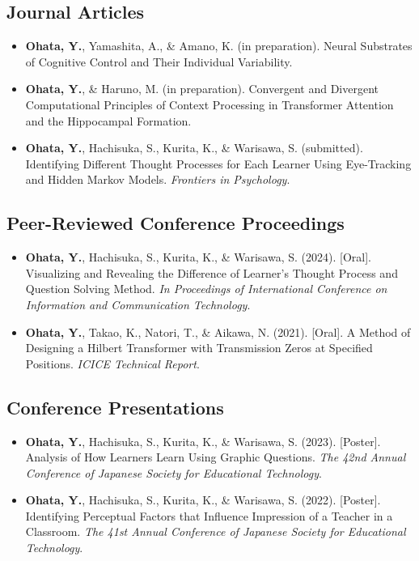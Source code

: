 \documentclass[letterpaper,10.5pt]{article}
\begin{document}
\subsection*{Journal Articles}
\begin{itemize}[label={}, leftmargin=15pt, itemsep=4pt, parsep=0pt, topsep=2pt]
  \item \textbf{Ohata, Y.}, Yamashita, A., \& Amano, K. (in preparation). Neural Substrates of Cognitive Control and Their Individual Variability.
  \item \textbf{Ohata, Y.}, \& Haruno, M. (in preparation). Convergent and Divergent Computational Principles of Context Processing in Transformer Attention and the Hippocampal Formation.
  \item \textbf{Ohata, Y.}, Hachisuka, S., Kurita, K., \& Warisawa, S. (submitted). Identifying Different Thought Processes for Each Learner Using Eye-Tracking and Hidden Markov Models. \textit{Frontiers in Psychology}.
\end{itemize}\vspace{2pt}
\subsection*{Peer-Reviewed Conference Proceedings}
\begin{itemize}[label={}, leftmargin=15pt, itemsep=4pt, parsep=0pt, topsep=2pt]
  \item \textbf{Ohata, Y.}, Hachisuka, S., Kurita, K., \& Warisawa, S. (2024). [Oral]. Visualizing and Revealing the Difference of Learner's Thought Process and Question Solving Method. \textit{In Proceedings of International Conference on Information and Communication Technology}.
  \item \textbf{Ohata, Y.}, Takao, K., Natori, T., \& Aikawa, N. (2021). [Oral]. A Method of Designing a Hilbert Transformer with Transmission Zeros at Specified Positions. \textit{ICICE Technical Report}.
\end{itemize}\vspace{2pt}
\subsection*{Conference Presentations}
\begin{itemize}[label={}, leftmargin=15pt, itemsep=4pt, parsep=0pt, topsep=2pt]
  \item \textbf{Ohata, Y.}, Hachisuka, S., Kurita, K., \& Warisawa, S. (2023). [Poster]. Analysis of How Learners Learn Using Graphic Questions. \textit{The 42nd Annual Conference of Japanese Society for Educational Technology}.
  \item \textbf{Ohata, Y.}, Hachisuka, S., Kurita, K., \& Warisawa, S. (2022). [Poster]. Identifying Perceptual Factors that Influence Impression of a Teacher in a Classroom. \textit{The 41st Annual Conference of Japanese Society for Educational Technology}.
\end{itemize}\vspace{2pt}
\end{document}
